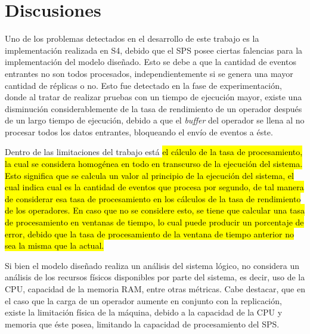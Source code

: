 \section{Discusiones}

Uno de los problemas detectados en el desarrollo de este trabajo es la implementación realizada en S4, debido que el SPS posee ciertas falencias para la implementación del modelo diseñado. Esto se debe a que la cantidad de eventos entrantes no son todos procesados, independientemente si se genera una mayor cantidad de réplicas o no. Esto fue detectado en la fase de experimentación, donde al tratar de realizar pruebas con un tiempo de ejecución mayor, existe una disminución considerablemente de la tasa de rendimiento de un operador después de un largo tiempo de ejecución, debido a que el \textit{buffer} del operador se llena al no procesar todos los datos entrantes, bloqueando el envío de eventos a éste.


Dentro de las limitaciones del trabajo está \hl{el cálculo de la tasa de procesamiento, la cual se considera homogénea en todo en transcurso de la ejecución del sistema. Esto significa que se calcula un valor al principio de la ejecución del sistema, el cual indica cual es la cantidad de eventos que procesa por segundo, de tal manera de considerar esa tasa de procesamiento en los cálculos de la tasa de rendimiento de los operadores. En caso que no se considere esto, se tiene que calcular una tasa de procesamiento en ventanas de tiempo, lo cual puede producir un porcentaje de error, debido que la tasa de procesamiento de la ventana de tiempo anterior no sea la misma que la actual.}

Si bien el modelo diseñado realiza un análisis del sistema lógico, no considera un análisis de los recursos físicos disponibles por parte del sistema, es decir, uso de la CPU, capacidad de la memoria RAM, entre otras métricas. Cabe destacar, que en el caso que la carga de un operador aumente en conjunto con la replicación, existe la limitación física de la máquina, debido a la capacidad de la CPU y memoria que éste posea, limitando la capacidad de procesamiento del SPS.

